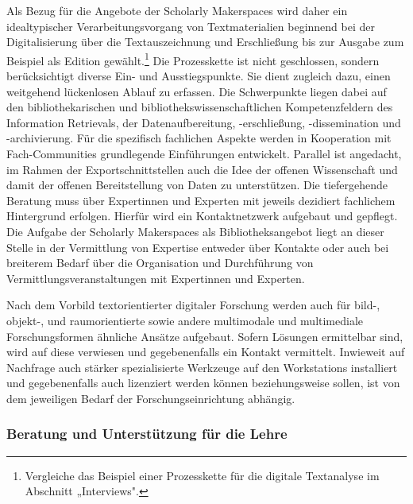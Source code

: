 \documentclass[a4paper,
fontsize=11pt,
oneside,
numbers=noperiodatend,
parskip=half-,
bibliography=totoc,
final
]{scrartcl}
\begin{document}
Als Bezug für die Angebote der Scholarly Makerspaces wird daher ein
idealtypischer Verarbeitungsvorgang von Textmaterialien beginnend bei
der Digitalisierung über die Textauszeichnung und Erschließung bis zur
Ausgabe zum Beispiel als Edition gewählt.\footnote{Vergleiche das
  Beispiel einer Prozesskette für die digitale Textanalyse im Abschnitt
  „Interviews".} Die Prozesskette ist nicht geschlossen, sondern
berücksichtigt diverse Ein- und Ausstiegspunkte. Sie dient zugleich
dazu, einen weitgehend lückenlosen Ablauf zu erfassen. Die Schwerpunkte
liegen dabei auf den bibliothekarischen und
bibliothekswissenschaftlichen Kompetenzfeldern des Information
Retrievals, der Datenaufbereitung, -erschließung, -dissemination und
-archivierung. Für die spezifisch fachlichen Aspekte werden in
Kooperation mit Fach-Communities grundlegende Einführungen entwickelt.
Parallel ist angedacht, im Rahmen der Exportschnittstellen auch die Idee
der offenen Wissenschaft und damit der offenen Bereitstellung von Daten
zu unterstützen. Die tiefergehende Beratung muss über Expertinnen und
Experten mit jeweils dezidiert fachlichem Hintergrund erfolgen. Hierfür
wird ein Kontaktnetzwerk aufgebaut und gepflegt. Die Aufgabe der
Scholarly Makerspaces als Bibliotheksangebot liegt an dieser Stelle in
der Vermittlung von Expertise entweder über Kontakte oder auch bei
breiterem Bedarf über die Organisation und Durchführung von
Vermittlungsveranstaltungen mit Expertinnen und Experten.

Nach dem Vorbild textorientierter digitaler Forschung werden auch für
bild-, objekt-, und raumorientierte sowie andere multimodale und
multimediale Forschungsformen ähnliche Ansätze aufgebaut. Sofern
Lösungen ermittelbar sind, wird auf diese verwiesen und gegebenenfalls
ein Kontakt vermittelt. Inwieweit auf Nachfrage auch stärker
spezialisierte Werkzeuge auf den Workstations installiert und
gegebenenfalls auch lizenziert werden können beziehungsweise sollen, ist
von dem jeweiligen Bedarf der Forschungseinrichtung abhängig.

\hypertarget{beratung-und-unterstuxfctzung-fuxfcr-die-lehre}{%
\subsubsection{Beratung und Unterstützung für die
Lehre}\label{beratung-und-unterstuxfctzung-fuxfcr-die-lehre}}
\end{document}
